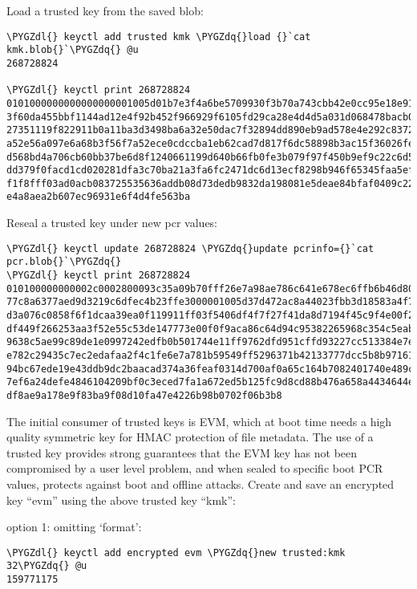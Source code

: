 \documentclass[a4paper,8pt,english]{sphinxmanual}
\def\PYGZdl{\char`\$}
\def\PYGZdq{\char`\"}
\begin{document}
Load a trusted key from the saved blob:

\begin{Verbatim}[commandchars=\\\{\}]
\PYGZdl{} keyctl add trusted kmk \PYGZdq{}load {}`cat kmk.blob{}`\PYGZdq{} @u
268728824

\PYGZdl{} keyctl print 268728824
0101000000000000000001005d01b7e3f4a6be5709930f3b70a743cbb42e0cc95e18e915
3f60da455bbf1144ad12e4f92b452f966929f6105fd29ca28e4d4d5a031d068478bacb0b
27351119f822911b0a11ba3d3498ba6a32e50dac7f32894dd890eb9ad578e4e292c83722
a52e56a097e6a68b3f56f7a52ece0cdccba1eb62cad7d817f6dc58898b3ac15f36026fec
d568bd4a706cb60bb37be6d8f1240661199d640b66fb0fe3b079f97f450b9ef9c22c6d5d
dd379f0facd1cd020281dfa3c70ba21a3fa6fc2471dc6d13ecf8298b946f65345faa5ef0
f1f8fff03ad0acb083725535636addb08d73dedb9832da198081e5deae84bfaf0409c22b
e4a8aea2b607ec96931e6f4d4fe563ba
\end{Verbatim}

Reseal a trusted key under new pcr values:

\begin{Verbatim}[commandchars=\\\{\}]
\PYGZdl{} keyctl update 268728824 \PYGZdq{}update pcrinfo={}`cat pcr.blob{}`\PYGZdq{}
\PYGZdl{} keyctl print 268728824
010100000000002c0002800093c35a09b70fff26e7a98ae786c641e678ec6ffb6b46d805
77c8a6377aed9d3219c6dfec4b23ffe3000001005d37d472ac8a44023fbb3d18583a4f73
d3a076c0858f6f1dcaa39ea0f119911ff03f5406df4f7f27f41da8d7194f45c9f4e00f2e
df449f266253aa3f52e55c53de147773e00f0f9aca86c64d94c95382265968c354c5eab4
9638c5ae99c89de1e0997242edfb0b501744e11ff9762dfd951cffd93227cc513384e7e6
e782c29435c7ec2edafaa2f4c1fe6e7a781b59549ff5296371b42133777dcc5b8b971610
94bc67ede19e43ddb9dc2baacad374a36feaf0314d700af0a65c164b7082401740e489c9
7ef6a24defe4846104209bf0c3eced7fa1a672ed5b125fc9d8cd88b476a658a4434644ef
df8ae9a178e9f83ba9f08d10fa47e4226b98b0702f06b3b8
\end{Verbatim}

The initial consumer of trusted keys is EVM, which at boot time needs a high
quality symmetric key for HMAC protection of file metadata.  The use of a
trusted key provides strong guarantees that the EVM key has not been
compromised by a user level problem, and when sealed to specific boot PCR
values, protects against boot and offline attacks.  Create and save an
encrypted key ``evm'' using the above trusted key ``kmk'':

option 1: omitting `format':

\begin{Verbatim}[commandchars=\\\{\}]
\PYGZdl{} keyctl add encrypted evm \PYGZdq{}new trusted:kmk 32\PYGZdq{} @u
159771175
\end{Verbatim}
\end{document}
